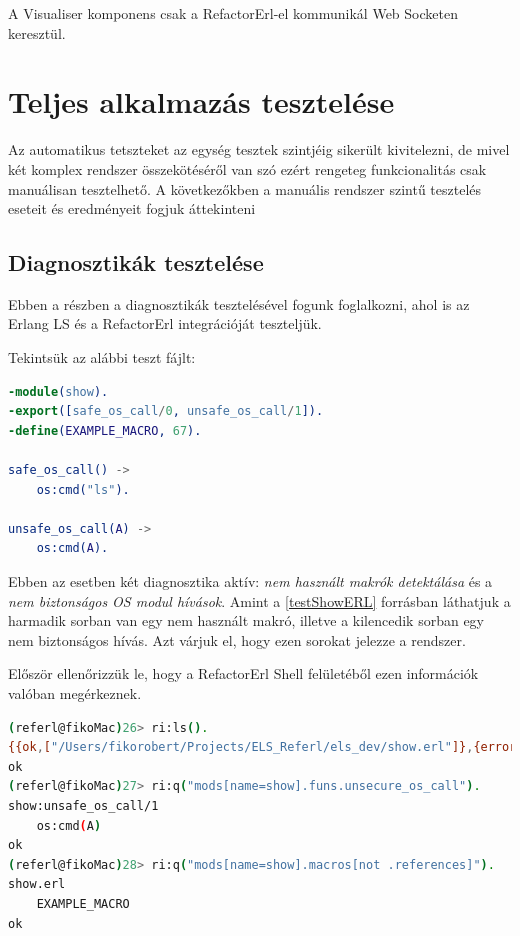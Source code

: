 A Visualiser komponens csak a RefactorErl-el kommunikál Web Socketen keresztül.



\section{Teljes alkalmazás tesztelése}

Az automatikus tetszteket az egység tesztek szintjéig sikerült kivitelezni, de mivel két komplex rendszer összekötéséről van szó ezért rengeteg funkcionalitás csak manuálisan tesztelhető. A következőkben a manuális rendszer szintű tesztelés eseteit és eredményeit fogjuk áttekinteni

\subsection{Diagnosztikák tesztelése}

Ebben a részben a diagnosztikák tesztelésével fogunk foglalkozni, ahol is az Erlang LS és a RefactorErl integrációját teszteljük.

\noindent Tekintsük az alábbi teszt fájlt:

 \label{testShowERL}
\begin{lstlisting}[language={erlang}]  
-module(show).
-export([safe_os_call/0, unsafe_os_call/1]).
-define(EXAMPLE_MACRO, 67).

safe_os_call() ->
    os:cmd("ls").

unsafe_os_call(A) ->
    os:cmd(A).
\end{lstlisting}

Ebben az esetben két diagnosztika aktív: \textit{nem használt makrók detektálása} és a \textit{nem biztonságos OS modul hívások}. Amint a \ref{testShowERL} forrásban láthatjuk a harmadik sorban van egy nem használt makró, illetve a kilencedik sorban egy nem biztonságos hívás. Azt várjuk el, hogy ezen sorokat jelezze a rendszer.

\noindent Először ellenőrizzük le, hogy a RefactorErl Shell felületéből ezen információk valóban megérkeznek.

 \label{testShowSHELL}
\begin{lstlisting}[language={sh}]  
(referl@fikoMac)26> ri:ls().                                        
{{ok,["/Users/fikorobert/Projects/ELS_Referl/els_dev/show.erl"]},{error,[]}}
ok
(referl@fikoMac)27> ri:q("mods[name=show].funs.unsecure_os_call").  
show:unsafe_os_call/1
    os:cmd(A)
ok
(referl@fikoMac)28> ri:q("mods[name=show].macros[not .references]").
show.erl
    EXAMPLE_MACRO
ok
\end{lstlisting}


